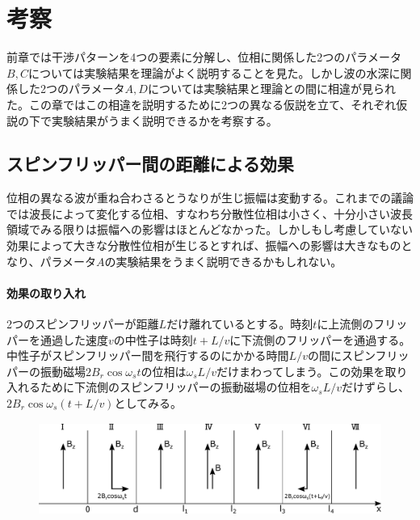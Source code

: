 \section{考察}
前章では干渉パターンを4つの要素に分解し、位相に関係した2つのパラメータ$B, C$については実験結果を理論がよく説明することを見た。しかし波の水深に関係した2つのパラメータ$A, D$については実験結果と理論との間に相違が見られた。この章ではこの相違を説明するために2つの異なる仮説を立て、それぞれ仮説の下で実験結果がうまく説明できるかを考察する。

\subsection{スピンフリッパー間の距離による効果}
位相の異なる波が重ね合わさるとうなりが生じ振幅は変動する。これまでの議論では波長によって変化する位相、すなわち分散性位相は小さく、十分小さい波長領域でみる限りは振幅への影響はほとんどなかった。しかしもし考慮していない効果によって大きな分散性位相が生じるとすれば、振幅への影響は大きなものとなり、パラメータ$A$の実験結果をうまく説明できるかもしれない。

\paragraph{効果の取り入れ}
2つのスピンフリッパーが距離$L$だけ離れているとする。時刻$t$に上流側のフリッパーを通過した速度$v$の中性子は時刻$t+L/v$に下流側のフリッパーを通過する。中性子がスピンフリッパー間を飛行するのにかかる時間$L/v$の間にスピンフリッパーの振動磁場$2B_r\cos\omega_s t$の位相は$\omega_s L/v$だけまわってしまう。この効果を取り入れるために下流側のスピンフリッパーの振動磁場の位相を$\omega_s L/v$だけずらし、$2B_r\cos\omega_s (t+L/v)$としてみる。
\begin{figure}[h]
\centering
\includegraphics[height=3cm]{discussion/FD/FD_setting.pdf}
\end{figure}

